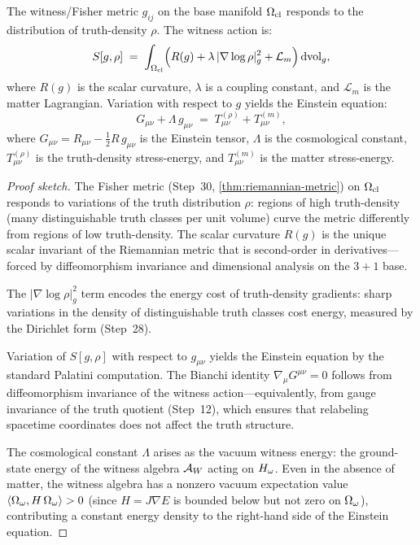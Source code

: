 \begin{theorem}
\label{thm:einstein}
The witness/Fisher metric $g_{ij}$ on the base manifold $\Omega_{\mathrm{cl}}$ responds
to the distribution of truth-density $\rho$.  The witness action is:
\[
  S[g, \rho] \;=\; \int_{\Omega_{\mathrm{cl}}}
  \Bigl( R(g) + \lambda\, |\nabla \log \rho|^2_g + \mathcal{L}_m \Bigr)\,
  \mathrm{dvol}_g,
\]
where $R(g)$ is the scalar curvature, $\lambda$ is a coupling constant, and
$\mathcal{L}_m$ is the matter Lagrangian.  Variation with respect to $g$
yields the Einstein equation:
\[
  G_{\mu\nu} + \Lambda\, g_{\mu\nu}
  \;=\; T^{(\rho)}_{\mu\nu} + T^{(m)}_{\mu\nu},
\]
where $G_{\mu\nu} = R_{\mu\nu} - \tfrac{1}{2} R\, g_{\mu\nu}$ is the
Einstein tensor, $\Lambda$ is the cosmological constant,
$T^{(\rho)}_{\mu\nu}$ is the truth-density stress-energy, and
$T^{(m)}_{\mu\nu}$ is the matter stress-energy.
\begin{proof}[Proof sketch]
The Fisher metric (Step~30, \cref{thm:riemannian-metric}) on $\Omega_{\mathrm{cl}}$
responds to variations of the truth distribution $\rho$: regions of
high truth-density (many distinguishable truth classes per unit volume)
curve the metric differently from regions of low truth-density.  The
scalar curvature $R(g)$ is the unique scalar invariant of the Riemannian
metric that is second-order in derivatives---forced by diffeomorphism
invariance and dimensional analysis on the $3+1$ base.

The $|\nabla \log \rho|^2_g$ term encodes the energy cost of truth-density
gradients: sharp variations in the density of distinguishable truth classes
cost energy, measured by the Dirichlet form (Step~28).

Variation of $S[g,\rho]$ with respect to $g_{\mu\nu}$ yields the Einstein
equation by the standard Palatini computation.  The Bianchi identity
$\nabla_\mu G^{\mu\nu} = 0$ follows from diffeomorphism invariance of the
witness action---equivalently, from gauge invariance of the truth quotient
(Step~12), which ensures that relabeling spacetime coordinates does not
affect the truth structure.

The cosmological constant $\Lambda$ arises as the vacuum witness energy:
the ground-state energy of the witness algebra $\mathcal{A}_W$ acting on $H_\omega$.
Even in the absence of matter, the witness algebra has a nonzero vacuum
expectation value $\langle \Omega_\omega, H\, \Omega_\omega \rangle > 0$ (since
$H = J\nabla E$ is bounded below but not zero on $\Omega_\omega$), contributing a
constant energy density to the right-hand side of the Einstein equation.

\end{proof}
\end{theorem}

